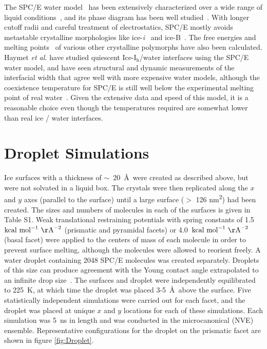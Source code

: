 \documentclass[aps,jcp,preprint,showpacs,superscriptaddress,groupedaddress]{revtex4}  %
\begin{document}
The SPC/E water model~\cite{Berendsen87} has been extensively
characterized over a wide range of liquid
conditions~\cite{Arbuckle02,Kuang12}, and its phase diagram has been
well studied~\cite{Baez95,Bryk04b,Sanz04b,Fennell:2005fk}. With longer
cutoff radii and careful treatment of electrostatics, SPC/E mostly
avoids metastable crystalline morphologies like
ice-\textit{i}~\cite{Fennell:2005fk} and ice-B~\cite{Baez95}.  The
free energies and melting
points~\cite{Baez95,Arbuckle02,Gay02,Bryk02,Bryk04b,Sanz04b,Fennell:2005fk,Fernandez06,Abascal07,Vrbka07}
of various other crystalline polymorphs have also been calculated.
Haymet \textit{et al.} have studied quiescent Ice-I$_\mathrm{h}$/water
interfaces using the SPC/E water model, and have seen structural and
dynamic measurements of the interfacial width that agree well with
more expensive water models, although the coexistence temperature for
SPC/E is still well below the experimental melting point of real
water~\cite{Bryk02}. Given the extensive data and speed of this model,
it is a reasonable choice even though the temperatures required are
somewhat lower than real ice / water interfaces.

\section{Droplet Simulations}
Ice surfaces with a thickness of $\sim$~20~\AA\ were created as
described above, but were not solvated in a liquid box. The crystals
were then replicated along the $x$ and $y$ axes (parallel to the
surface) until a large surface ($>$ 126 nm\textsuperscript{2}) had
been created.  The sizes and numbers of molecules in each of the
surfaces is given in Table S1.  Weak translational restraining
potentials with spring constants of 1.5~$\mathrm{kcal\
  mol}^{-1}\mathrm{~\AA}^{-2}$ (prismatic and pyramidal facets) or
4.0~$\mathrm{kcal\ mol}^{-1}\mathrm{~\AA}^{-2}$ (basal facet) were
applied to the centers of mass of each molecule in order to prevent
surface melting, although the molecules were allowed to reorient
freely. A water droplet containing 2048 SPC/E molecules was created
separately. Droplets of this size can produce agreement with the Young
contact angle extrapolated to an infinite drop size~\cite{Daub10}. The
surfaces and droplet were independently equilibrated to 225~K, at
which time the droplet was placed 3-5~\AA\ above the surface.  Five
statistically independent simulations were carried out for each facet,
and the droplet was placed at unique $x$ and $y$ locations for each of
these simulations.  Each simulation was 5~ns in length and was
conducted in the microcanonical (NVE) ensemble.  Representative
configurations for the droplet on the prismatic facet are shown in
figure \ref{fig:Droplet}.
\end{document}
